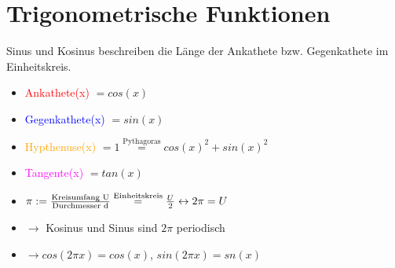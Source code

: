\pagebreak

\section{Trigonometrische Funktionen}

\begin{definition}[Einheitskreis]
Sinus und Kosinus beschreiben die Länge der Ankathete bzw. Gegenkathete im Einheitskreis.

\begin{multicols}{2}
	\begin{itemize}[label={}, noitemsep]
		\item \textcolor{red}{Ankathete(x)} $= cos(x)$
		\item \textcolor{blue}{Gegenkathete(x)} $= sin(x)$
		\item \textcolor{orange}{Hypthenuse(x)} $= 1 \overset{\text{Pythagoras}}{=} cos(x)^2 + sin(x)^2$	
		\item \textcolor{magenta}{Tangente(x)} $= tan(x)$			
		\item $\pi := \frac{\textnormal{Kreisumfang U}}{\textnormal{Durchmesser d}} \overset{\text{Einheitskreis}}{=} \frac{U}{2} \leftrightarrow 2 \pi = U $
		\item $\rightarrow$ Kosinus und Sinus sind $2 \pi$ periodisch
		\item $\rightarrow cos(2 \pi x) = cos(x)$, $sin(2 \pi x) = sn(x)$
	\end{itemize}
\end{multicols}



\end{definition}


